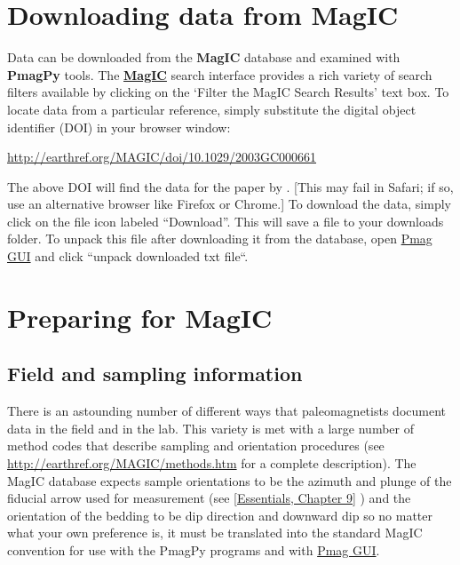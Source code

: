 \documentclass[11pt]{book}
\begin{document}
{

\section{Downloading data from {\bf MagIC}}

Data can be downloaded from the {\bf MagIC} database and examined with {\bf PmagPy} tools.   The \href{http://earthref.org/MAGIC/search/}{\bf MagIC} search interface provides a rich variety of search filters available by clicking on the `Filter the MagIC Search Results' text box.    To locate data from a particular reference,  simply substitute the digital object identifier (DOI) in your browser window:

\href{http://earthref.org/MAGIC/doi/10.1029/2003GC000661}{http://earthref.org/MAGIC/doi/10.1029/2003GC000661}

\noindent The above DOI will find the data for the paper by \cite{tauxe04b}.  [This may fail in Safari; if so, use an alternative browser like Firefox or Chrome.]     To download the data, simply click on the file icon labeled ``Download''.  This will save a file to your downloads folder.
 To unpack this file after downloading it from the database, open \href{#pmag_gui.py}{Pmag GUI} and click ``unpack downloaded txt file``.


 \section{Preparing for MagIC}


\subsection{Field and sampling information}

 There is an astounding number of different ways that paleomagnetists document data in the field and in the lab. This variety is met with a large number  of method codes that describe sampling and orientation procedures (see \url{http://earthref.org/MAGIC/methods.htm} for a complete description).   The MagIC database expects sample orientations to be the azimuth and plunge of the fiducial arrow used for measurement (see  \href{http://earthref.org/MAGIC/books/Tauxe/Essentials/WebBook3ch2.html#ch2}{[Essentials, Chapter 9]} )  and the orientation of the bedding to be dip direction and downward dip so no matter what your own preference is, it must be translated into the standard MagIC convention for use with the PmagPy programs and with \href{#pmag_gui.py}{Pmag GUI}.

}
\end{document}
